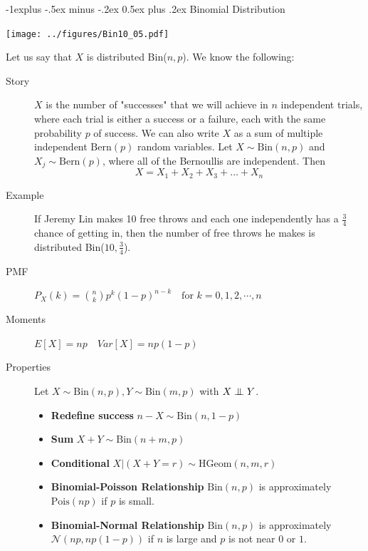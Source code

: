 \documentclass[10pt,landscape]{article}
\makeatletter
\newcommand\independent{\protect\mathpalette{\protect\independenT}{\perp}}
\def\independenT#1#2{\mathrel{\setbox0\hbox{$#1#2$}%
    \copy0\kern-\wd0\mkern4mu\box0}}
\newcommand{\N}{\mathcal{N}}
\newcommand{\Bern}{\textrm{Bern}}
\newcommand{\Bin}{\textrm{Bin}}
\newcommand{\Pois}{\textrm{Pois}}
\newcommand{\HGeom}{\textrm{HGeom}}
\renewcommand{\subsection}{\@startsection{subsection}{2}{0mm}%
                                {-1explus -.5ex minus -.2ex}%
                                {0.5ex plus .2ex}%
                                {\normalfont\normalsize\bfseries}}
\makeatother
\begin{document}
\begin{multicols*}{3}
    \subsection{Binomial Distribution} 
    \begin{minipage}{\linewidth}
        \centering
        \texttt{[image: ../figures/Bin10\_05.pdf]}
    \end{minipage}
                                    
    Let us say that $X$ is distributed \Bin($n,p$). We know the following:
    \begin{description}
        \item[Story] $X$ is the number of "successes" that we will achieve in $n$ independent trials, where each trial is either a success or a failure, each with the same probability $p$ of success. We can also write $X$ as a sum of multiple independent $\Bern(p)$ random variables. Let $X \sim \Bin(n, p)$ and $X_j \sim \Bern(p)$, where all of the Bernoullis are independent. Then
        \[X = X_1 + X_2 + X_3 + \dots + X_n\]
        \item[Example] If Jeremy Lin makes 10 free throws and each one independently has a $\frac{3}{4}$ chance of getting in, then the number of free throws he makes is distributed  \Bin($10,\frac{3}{4}$).
        \item[PMF] $P_X(k) = {n  \choose k} p^k(1-p)^{n-k} \quad \text{for  } k=0,1,2,\cdots,n$
        \item[Moments] $E[X] = np \quad Var[X] = np(1-p)$
        \item[Properties] Let $X \sim \Bin(n,p), Y \sim \Bin(m,p)$ with $X \independent Y$.
        \begin{itemize}
            \item \textbf{Redefine success} $n-X \sim \Bin(n,1-p)$
            \item \textbf{Sum} $X+Y \sim \Bin(n+m,p)$
            \item \textbf{Conditional} $X|(X+Y=r) \sim \HGeom(n,m,r)$
            \item \textbf{Binomial-Poisson Relationship} $\Bin(n, p)$ is approximately  $\Pois(np)$ if $p$ is small.
            \item \textbf{Binomial-Normal Relationship} $\Bin(n, p)$ is approximately $\N(np,np(1-p))$ if $n$ is large and $p$ is not near $0$ or $1$.
        \end{itemize}
    \end{description}
                                    

\end{multicols*}
\end{document}
